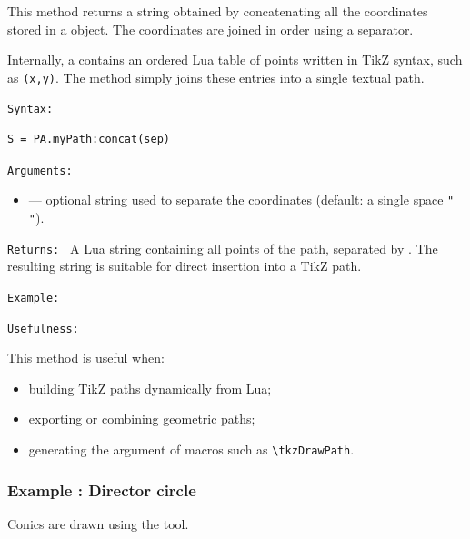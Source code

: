 This method returns a string obtained by concatenating all the coordinates stored
in a  object. The coordinates are joined in order using a
separator.

\medskip
Internally, a  contains an ordered Lua table of points written in
TikZ syntax, such as \verb|(x,y)|. The  method simply
joins these entries into a single textual path.

\medskip
\texttt{Syntax: }
\begin{verbatim}
S = PA.myPath:concat(sep)
\end{verbatim}

\medskip
\texttt{Arguments: }
\begin{itemize}
  \item {} — optional string used to separate the coordinates
        (default: a single space \verb|" "|).
\end{itemize}

\medskip
\texttt{Returns: }
A Lua string containing all points of the path, separated by .
The resulting string is suitable for direct insertion into a TikZ path.

\texttt{Example: }

\begin{tkzexample}
\end{tkzexample}


\texttt{Usefulness: }

This method is useful when:
\begin{itemize}
  \item building TikZ paths dynamically from Lua;
  \item exporting or combining geometric paths;
  \item generating the argument of macros such as \verb|\tkzDrawPath|.
\end{itemize}


\subsubsection{Example : Director circle }
\label{ssub:director_circle}


Conics are drawn using the  tool.

